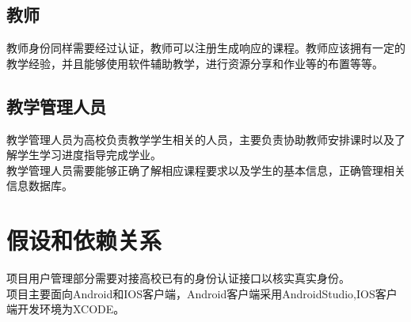 \subsection{教师}
教师身份同样需要经过认证，教师可以注册生成响应的课程。教师应该拥有一定的教学经验，并且能够使用软件辅助教学，进行资源分享和作业等的布置等等。
\subsection{教学管理人员}
教学管理人员为高校负责教学学生相关的人员，主要负责协助教师安排课时以及了解学生学习进度指导完成学业。\\
教学管理人员需要能够正确了解相应课程要求以及学生的基本信息，正确管理相关信息数据库。

\section{假设和依赖关系}
项目用户管理部分需要对接高校已有的身份认证接口以核实真实身份。\\
项目主要面向Android和IOS客户端，Android客户端采用AndroidStudio,IOS客户端开发环境为XCODE。\\
